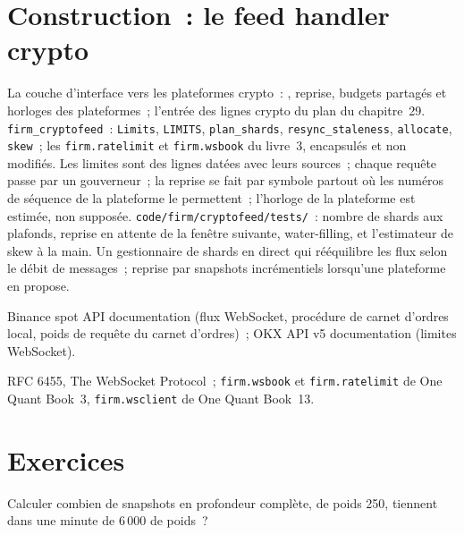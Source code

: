 \section{Construction~: le feed handler crypto}\label{bld:nw:api-engineering-for-crypto-venues:cryptofeed}

\begin{build}
 La couche d'interface vers les plateformes crypto~: , reprise, budgets partagés et horloges des plateformes~; l'entrée des lignes crypto du
plan du chapitre~29.
 \texttt{firm\_cryptofeed}~: \texttt{Limits}, \texttt{LIMITS}, \texttt{plan\_shards}, \texttt{resync\_staleness}, \texttt{allocate},
\texttt{skew}~; les \texttt{firm.ratelimit} et \texttt{firm.wsbook} du livre~3, encapsulés et non modifiés.
 Les limites sont des lignes datées avec leurs sources~; chaque requête passe par un gouverneur~; la reprise se fait par symbole partout où les numéros de séquence de la plateforme
le permettent~; l'horloge de la plateforme est estimée, non supposée.
 \texttt{code/firm/cryptofeed/tests/}~: nombre de shards aux plafonds, reprise en attente de la fenêtre suivante, water-filling, et
l'estimateur de skew à la main.
 Un gestionnaire de shards en direct qui rééquilibre les flux selon le débit de messages~; reprise par snapshots incrémentiels lorsqu'une plateforme en propose.
\end{build}

\begin{omsources}
\item Binance spot API documentation (flux WebSocket, procédure de carnet d'ordres local, poids de requête du carnet d'ordres)~; OKX API v5 documentation (limites WebSocket).
\item RFC 6455, The WebSocket Protocol~; \texttt{firm.wsbook} et \texttt{firm.ratelimit} de One Quant Book~3, \texttt{firm.wsclient} de One Quant Book~13.
\end{omsources}

\section{Exercices}

\begin{exercise}[$\star$]\label{exo:nw:api-engineering-for-crypto-venues:1}
Calculer combien de snapshots en profondeur complète, de poids 250, tiennent dans une minute de 6\,000 de poids~?
\end{exercise}

